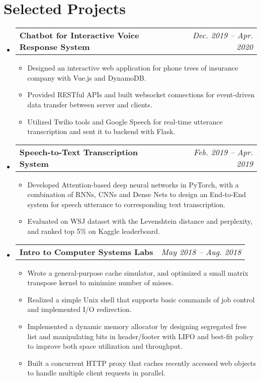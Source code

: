 \documentclass[letterpaper,11pt]{article}
\makeatletter
\newcommand{\resumeItemChg}[2]{
	\item\small{
		\textbf{#1}{#2 \vspace{-2pt}}
	}
}
\newcommand{\resumeSubheadingSimple}[2]{
  \vspace{-2pt}\item[]
    \begin{tabular*}{0.97\textwidth}{l@{\extracolsep{\fill}}r}
      \textbf{#1} & #2 
    \end{tabular*}\vspace{-9pt}
}
\newcommand{\resumeSubHeadingListStart}{\begin{itemize}[leftmargin=0.1em]}
\newcommand{\resumeSubHeadingListEnd}{\end{itemize}}
\newcommand{\resumeItemListStart}{\begin{itemize}[leftmargin=1em]}
\newcommand{\resumeItemListEnd}{\end{itemize}\vspace{-8pt}}
\makeatother
\begin{document}
\section{Selected Projects}
  \resumeSubHeadingListStart
      \resumeSubheadingSimple
      {Chatbot for Interactive Voice Response System}{\textit{\small{Dec. 2019 -- Apr. 2020}}}
      \resumeItemListStart
        \vspace{3pt}
        \resumeItemChg{}
        {Designed an interactive web application for phone trees of insurance company with Vue.js and DynamoDB.}
        \resumeItemChg{}
	    {Provided RESTful APIs and built websocket connections for event-driven data transfer between server and clients.}
	    \resumeItemChg{}
	    {Utilized Twilio tools and Google Speech for real-time utterance transcription and sent it to backend with Flask.}
      \resumeItemListEnd
      \vspace{3pt}
      
  
      \resumeSubheadingSimple
      {Speech-to-Text Transcription System}{\textit{\small{Feb. 2019 -- Apr. 2019}}}
      \resumeItemListStart
        \vspace{3pt}
        \resumeItemChg{}
        {Developed Attention-based deep neural networks in PyTorch, with a combination of RNNs, CNNs and Dense Nets to design an End-to-End system for speech utterance to corresponding text transcription.}
        \resumeItemChg{}
	    {Evaluated on WSJ dataset with the Levenshtein distance and perplexity, and ranked top 5\% on Kaggle leaderboard.}
      \resumeItemListEnd
      \vspace{3pt}

      
      \resumeSubheadingSimple
      {Intro to Computer Systems Labs}{\textit{\small{May 2018 -- Aug. 2018}}}
      \resumeItemListStart
        \vspace{3pt}
        \resumeItemChg{}
        {Wrote a general-purpose cache simulator, and optimized a small matrix transpose kernel to minimize number of misses.}
        \resumeItemChg{}
	    {Realized a simple Unix shell that supports basic commands of job control and implemented I/O redirection.}
	    \resumeItemChg{}
	    {Implemented a dynamic memory allocator by designing segregated free list and manipulating bits in header/footer with LIFO and best-fit policy to improve both space utilization and throughput.}
	    \resumeItemChg{}
	    {Built a concurrent HTTP proxy that caches recently accessed web objects to handle multiple client requests in parallel.}
      \resumeItemListEnd

  \resumeSubHeadingListEnd
 	
\end{document}

